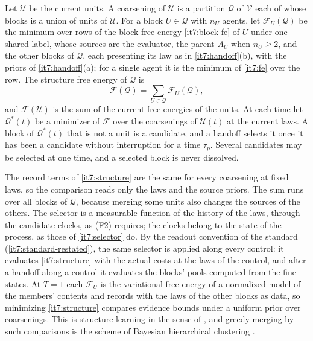 \documentclass[11pt,letterpaper]{report}
\begin{document}
Let $\mathcal U$ be the current units. A coarsening of $\mathcal U$ is a partition $\mathcal Q$ of $\mathcal V$ each of whose blocks is a union of units of $\mathcal U$. For a block $U\in\mathcal Q$ with $n_U$ agents, let $\mathcal F_U(\mathcal Q)$ be the minimum over rows of the block free energy \cref{it7:block-fe} of $U$ under one shared label, whose sources are the evaluator, the parent $A_U$ when $n_U\ge2$, and the other blocks of $\mathcal Q$, each presenting its law as in \cref{it7:handoff}(b), with the priors of \cref{it7:handoff}(a); for a single agent it is the minimum of \cref{it7:fe} over the row. The structure free energy of $\mathcal Q$ is
\begin{equation}
\mathcal F(\mathcal Q)=\sum_{U\in\mathcal Q}\mathcal F_U(\mathcal Q),
\label{it7:structure}
\end{equation}
and $\mathcal F(\mathcal U)$ is the sum of the current free energies of the units. At each time let $\mathcal Q^*(t)$ be a minimizer of $\mathcal F$ over the coarsenings of $\mathcal U(t)$ at the current laws. A block of $\mathcal Q^*(t)$ that is not a unit is a candidate, and a handoff selects it once it has been a candidate without interruption for a time $\tau_p$. Several candidates may be selected at one time, and a selected block is never dissolved.

The record terms of \cref{it7:structure} are the same for every coarsening at fixed laws, so the comparison reads only the laws and the source priors. The sum runs over all blocks of $\mathcal Q$, because merging some units also changes the sources of the others. The selector is a measurable function of the history of the laws, through the candidate clocks, as (F2) requires; the clocks belong to the state of the process, as those of \cref{it7:selector} do. By the readout convention of the standard (\cref{it7:standard-restated}), the same selector is applied along every control: it evaluates \cref{it7:structure} with the actual costs at the laws of the control, and after a handoff along a control it evaluates the blocks' pools computed from the fine states. At $T=1$ each $\mathcal F_U$ is the variational free energy of a normalized model of the members' contents and records with the laws of the other blocks as data, so minimizing \cref{it7:structure} compares evidence bounds under a uniform prior over coarsenings. This is structure learning in the sense of \citet{CzegelEtAl2019}, and greedy merging by such comparisons is the scheme of Bayesian hierarchical clustering \citep{HellerGhahramani2005}.
\end{document}
